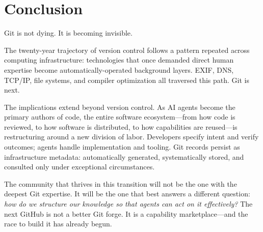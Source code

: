 \documentclass[sigconf, nonacm, anonymous=false]{acmart}
\begin{document}
\section{Conclusion}

Git is not dying. It is becoming invisible.

The twenty-year trajectory of version control follows a pattern repeated across computing infrastructure: technologies that once demanded direct human expertise become automatically-operated background layers. EXIF, DNS, TCP/IP, file systems, and compiler optimization all traversed this path. Git is next.

The implications extend beyond version control. As AI agents become the primary authors of code, the entire software ecosystem---from how code is reviewed, to how software is distributed, to how capabilities are reused---is restructuring around a new division of labor. Developers specify intent and verify outcomes; agents handle implementation and tooling. Git records persist as infrastructure metadata: automatically generated, systematically stored, and consulted only under exceptional circumstances.

The community that thrives in this transition will not be the one with the deepest Git expertise. It will be the one that best answers a different question: \textit{how do we structure our knowledge so that agents can act on it effectively?} The next GitHub is not a better Git forge. It is a capability marketplace---and the race to build it has already begun.



\end{document}
